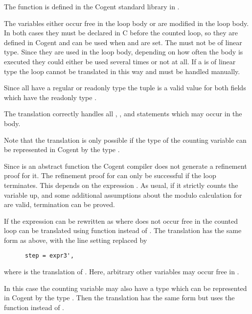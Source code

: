 The function  is defined in the Cogent standard library in .

The variables  either occur free in the loop body or are modified in the loop body.
In both cases they must be declared in C before the counted loop, so they are defined in Cogent and can be used
when  and  are set. The  must not be of linear type. Since they are used
in the loop body, depending on how often the body is executed they could either be used several times or not at all.
If a  is of linear type the loop cannot be translated in this way and must be handled manually.

Since all  have a regular or readonly type the tuple  is a valid value for 
both  fields which have the readonly type .

The translation correctly handles all , , and  statements which may occur 
in the body. 

Note that the translation is only possible if the type of the counting variable  can be represented in 
Cogent by the type .

Since  is an abstract function the Cogent compiler does not generate a refinement proof for it.
The refinement proof for  can only be successful if the loop terminates. This depends on the 
expression . As usual, if it strictly counts the variable  up, and some additional assumptions 
about the modulo calculation for  are valid, termination can be proved.

If the expression  can be rewritten as  where  does not occur free in 
the counted loop can be translated using 
function  instead of . The translation has the same form as above, with the line 
setting  replaced by
\begin{verbatim}
      step = expr3', 
\end{verbatim}
where  is the translation of . Here, arbitrary other variables may occur free in .

In this case the counting variable  may also have a type which can be represented in Cogent by the type .
Then the translation has the same form but uses the function  instead of .

